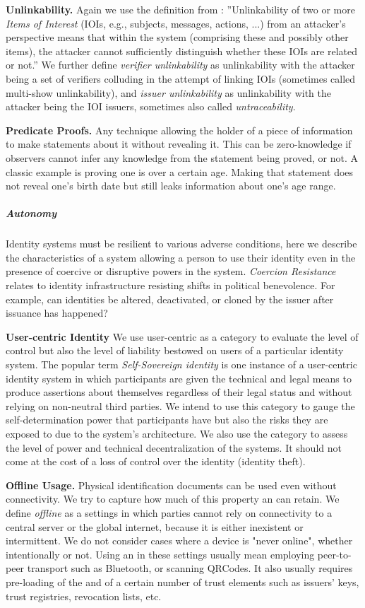 \textbf{Unlinkability.} Again we use the definition from \cite{ph10}: ''Unlinkability of two or more \emph{Items of Interest} (IOIs, e.g., subjects, messages, actions, ...)
from an attacker’s perspective means that within the system (comprising these and
possibly other items), the attacker cannot sufficiently distinguish whether these IOIs are
related or not.''
We further define \emph{verifier unlinkability} as unlinkability with the attacker being a set of verifiers colluding in the attempt of linking IOIs (sometimes called multi-show unlinkability), and \emph{issuer unlinkability} as unlinkability with the attacker being the IOI issuers, sometimes also called \emph{untraceability}.


\textbf{Predicate Proofs.} Any technique allowing the holder of a piece of information to make statements about it without revealing it. This can be zero-knowledge if observers cannot infer any knowledge from the statement being proved, or not. A classic example is proving one is over a certain age. Making that statement does not reveal one's birth date but still leaks information about one's age range.


\subparagraph{Autonomy} Identity systems must be resilient to various adverse conditions, here we describe the characteristics of a system allowing a person to use their identity even in the presence of coercive or disruptive powers in the system. \emph{Coercion Resistance} relates to identity infrastructure resisting shifts in political benevolence. For example, can identities be altered, deactivated, or cloned by the issuer after issuance has happened?


\textbf{User-centric Identity} We use user-centric as a category to evaluate the level of control but also the level of liability bestowed on users of a particular identity system. The popular term \emph{Self-Sovereign identity} is one instance of a user-centric identity system in which participants are given the technical and legal means to produce assertions about themselves regardless of their legal status and without relying on non-neutral third parties. We intend to use this category to gauge the self-determination power that participants have but also the risks they are exposed to due to the system's architecture. We also use the category to assess the level of power and technical decentralization of the systems. It should not come at the cost of a loss of control over the identity (identity theft).

\textbf{Offline Usage.} Physical identification documents can be used even without connectivity. We try to capture how much of this property an \eid can retain. We define \emph{offline} as a settings in which parties cannot rely on connectivity to a central server or the global internet, because it is either inexistent or intermittent. We do not consider cases where a device is "never online", whether intentionally or not. Using an \eid in these settings usually mean employing peer-to-peer transport such as Bluetooth, or scanning QRCodes. It also usually requires pre-loading of the \eid and of a certain number of trust elements such as issuers' keys, trust registries, revocation lists, etc.

